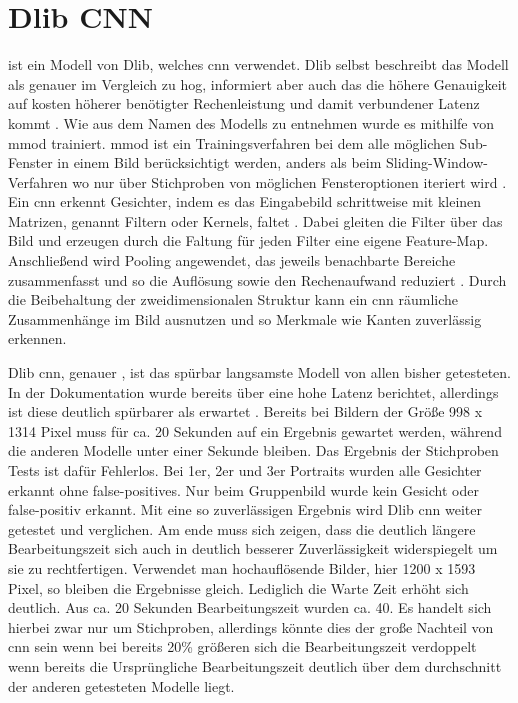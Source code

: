 \section{Dlib CNN}
 ist ein Modell von Dlib, welches \gls{cnn} verwendet. Dlib selbst beschreibt das Modell als genauer im Vergleich zu \gls{hog}, informiert aber auch das die höhere Genauigkeit auf kosten höherer benötigter Rechenleistung und damit verbundener Latenz kommt \parencite{cnnFaceDetectoroD}. Wie aus dem Namen des Modells zu entnehmen wurde es mithilfe von \gls{mmod} trainiert. \gls{mmod} ist ein Trainingsverfahren bei dem alle möglichen Sub-Fenster in einem Bild berücksichtigt werden, anders als beim Sliding-Window-Verfahren wo nur über Stichproben von möglichen Fensteroptionen iteriert wird \parencite{King15}. Ein \gls{cnn} erkennt Gesichter, indem es das Eingabebild schrittweise mit kleinen Matrizen, genannt Filtern oder Kernels, faltet \parencite{GeeksforGeeks25}. Dabei gleiten die Filter über das Bild und erzeugen durch die Faltung für jeden Filter eine eigene Feature-Map. Anschließend wird Pooling angewendet, das jeweils benachbarte Bereiche zusammenfasst und so die Auflösung sowie den Rechenaufwand reduziert \parencite{GeeksforGeeks25}. Durch die Beibehaltung der zweidimensionalen Struktur kann ein \gls{cnn} räumliche Zusammenhänge im Bild ausnutzen und so Merkmale wie Kanten zuverlässig erkennen.

Dlib \gls{cnn}, genauer , ist das spürbar langsamste Modell von allen bisher getesteten. In der Dokumentation wurde bereits über eine hohe Latenz berichtet, allerdings ist diese deutlich spürbarer als erwartet \parencite{cnnFaceDetectoroD}. Bereits bei Bildern der Größe 998 x 1314 Pixel muss für ca. 20 Sekunden auf ein Ergebnis gewartet werden, während die anderen Modelle unter einer Sekunde bleiben. Das Ergebnis der Stichproben Tests ist dafür Fehlerlos. Bei 1er, 2er und 3er Portraits wurden alle Gesichter erkannt ohne false-positives. Nur beim Gruppenbild wurde kein Gesicht oder false-positiv erkannt. Mit eine so zuverlässigen Ergebnis wird Dlib \gls{cnn} weiter getestet und verglichen. Am ende muss sich zeigen, dass die deutlich längere Bearbeitungszeit sich auch in deutlich besserer Zuverlässigkeit widerspiegelt um sie zu rechtfertigen. Verwendet man hochauflösende Bilder, hier 1200 x 1593 Pixel, so bleiben die Ergebnisse gleich. Lediglich die Warte Zeit erhöht sich deutlich. Aus ca. 20 Sekunden Bearbeitungszeit wurden ca. 40. Es handelt sich hierbei zwar nur um Stichproben, allerdings könnte dies der große Nachteil von \gls{cnn} sein wenn bei bereits 20\% größeren sich die Bearbeitungszeit verdoppelt wenn bereits die Ursprüngliche Bearbeitungszeit deutlich über dem durchschnitt der anderen getesteten Modelle liegt.

